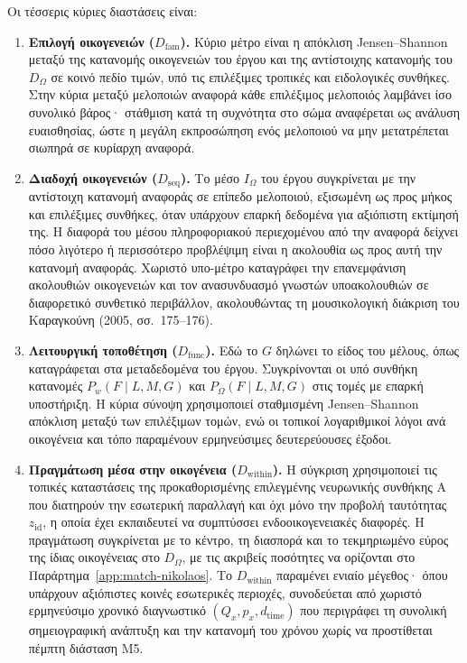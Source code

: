\documentclass[11pt,a4paper]{article}
\begin{document}
Οι τέσσερις κύριες διαστάσεις είναι:
\begin{enumerate}[label=\textbf{\arabic*.},leftmargin=2.2em]
\item \textbf{Επιλογή οικογενειών ($D_{\mathrm{fam}}$).} Κύριο μέτρο είναι η απόκλιση Jensen--Shannon μεταξύ της κατανομής οικογενειών του έργου και της αντίστοιχης κατανομής του $D_{\Omega}$ σε κοινό πεδίο τιμών, υπό τις επιλέξιμες τροπικές και ειδολογικές συνθήκες. Στην κύρια μεταξύ μελοποιών αναφορά κάθε επιλέξιμος μελοποιός λαμβάνει ίσο συνολικό βάρος· στάθμιση κατά τη συχνότητα στο σώμα αναφέρεται ως ανάλυση ευαισθησίας, ώστε η μεγάλη εκπροσώπηση ενός μελοποιού να μην μετατρέπεται σιωπηρά σε κυρίαρχη αναφορά.
\item \textbf{Διαδοχή οικογενειών ($D_{\mathrm{seq}}$).} Το μέσο $I_{\Omega}$ του έργου συγκρίνεται με την αντίστοιχη κατανομή αναφοράς σε επίπεδο μελοποιού, εξισωμένη ως προς μήκος και επιλέξιμες συνθήκες, όταν υπάρχουν επαρκή δεδομένα για αξιόπιστη εκτίμησή της. Η διαφορά του μέσου πληροφοριακού περιεχομένου από την αναφορά δείχνει πόσο λιγότερο ή περισσότερο προβλέψιμη είναι η ακολουθία ως προς αυτή την κατανομή αναφοράς. Χωριστό υπο-μέτρο καταγράφει την επανεμφάνιση ακολουθιών οικογενειών και τον ανασυνδυασμό γνωστών υποακολουθιών σε διαφορετικό συνθετικό περιβάλλον, ακολουθώντας τη μουσικολογική διάκριση του Καραγκούνη (2005, σσ.~175--176).
\item \textbf{Λειτουργική τοποθέτηση ($D_{\mathrm{func}}$).} Εδώ το $G$ δηλώνει το είδος του μέλους, όπως καταγράφεται στα μεταδεδομένα του έργου. Συγκρίνονται οι υπό συνθήκη κατανομές $P_w(F\mid L,M,G)$ και $P_{\Omega}(F\mid L,M,G)$ στις τομές με επαρκή υποστήριξη. Η κύρια σύνοψη χρησιμοποιεί σταθμισμένη Jensen--Shannon απόκλιση μεταξύ των επιλέξιμων τομών, ενώ οι τοπικοί λογαριθμικοί λόγοι ανά οικογένεια και τόπο παραμένουν ερμηνεύσιμες δευτερεύουσες έξοδοι.
\item \textbf{Πραγμάτωση μέσα στην οικογένεια ($D_{\mathrm{within}}$).} Η σύγκριση χρησιμοποιεί τις τοπικές καταστάσεις της προκαθορισμένης επιλεγμένης νευρωνικής συνθήκης A που διατηρούν την εσωτερική παραλλαγή και όχι μόνο την προβολή ταυτότητας $z_{\mathrm{id}}$, η οποία έχει εκπαιδευτεί να συμπτύσσει ενδοοικογενειακές διαφορές. Η πραγμάτωση συγκρίνεται με το κέντρο, τη διασπορά και το τεκμηριωμένο εύρος της ίδιας οικογένειας στο $D_{\Omega}$, με τις ακριβείς ποσότητες να ορίζονται στο Παράρτημα~\ref{app:match-nikolaos}. Το $D_{\mathrm{within}}$ παραμένει ενιαίο μέγεθος· όπου υπάρχουν αξιόπιστες κοινές εσωτερικές περιοχές, συνοδεύεται από χωριστό ερμηνεύσιμο χρονικό διαγνωστικό $(Q_x,p_x,d_{\mathrm{time}})$ που περιγράφει τη συνολική σημειογραφική ανάπτυξη και την κατανομή του χρόνου χωρίς να προστίθεται πέμπτη διάσταση M5.


\end{enumerate}
\end{document}

